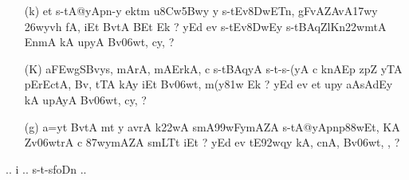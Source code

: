 \def\DevnagVersion{2.15}\documentclass{article}
\begin{document}
\begin{itemize}
\begin{itemize}
               \item[({\dn k})] {\dn et s\2-tA@yApn-y ektm u\38Cw\?\35Bwy y s\2-tEv\38DwET\0n, gFvA\0ZAvA\317wy\2 \326wyvh fA, iEt BvtA\2 BEt Ek {\rs ?\re} yEd ev s\2-tEv\38DwEy\0 s\2-tBAqZl\?Kn\322wmtA\2 EnmA\0\2 kA upyA Bv\306wt, cy\?, {\rs ?\re}}
               
               \item[({\dn K})] {\dn a\3FEwgSBvys, mArA, mAErkA, c s\2-tBAqyA s\2-t{\rs -\re}s\2-(yA c k\?nAEp zp\?Z yTA pErEctA, Bv\?, tTA kAy\0 iEt Bv\306wt, m(y\381w\? Ek {\rs ?\re} yEd ev et up\?y aAsAdEy\2 kA upAyA Bv\306wt, cy\?, {\rs ?\re}}
               
               \item[({\dn g})] {\dn a=y\?t BvtA\2 mt y avrA k\322wA smA\399wFymAZA s\2-tA@yApnp\388wEt, KA Zv\306wtrA c \387wymAZA smLT\4t iEt {\rs ?\re} yEd ev tE\392wqy\? kA, cnA, Bv\306wt, \0, {\rs ?\re}}
 
                \end{itemize}      
                                                                
\end{itemize}

\begin{center}
{\dn .. i .. s\2-t{\rs -\re}s\2foDn ..}
\end{center}
\end{document}
